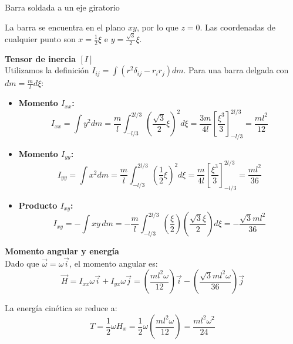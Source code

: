 \begin{solucion}{Barra soldada a un eje giratorio}
\begin{center}
\end{center}

La barra se encuentra en el plano $xy$, por lo que $z = 0$. Las coordenadas de cualquier punto son $x = \frac{1}{2}\xi$ e $y = \frac{\sqrt{3}}{2}\xi$.

\textbf{Tensor de inercia $[I]$}\\
Utilizamos la definición $I_{ij} = \int (r^2 \delta_{ij} - r_i r_j) dm$. Para una barra delgada con $dm = \frac{m}{l} d\xi$:

\begin{itemize}
    \item \textbf{Momento $I_{xx}$:}
    \[ I_{xx} = \int y^2 dm = \frac{m}{l} \int_{-l/3}^{2l/3} \left( \frac{\sqrt{3}}{2}\xi \right)^2 d\xi = \frac{3m}{4l} \left[ \frac{\xi^3}{3} \right]_{-l/3}^{2l/3} = \frac{ml^2}{12} \]

    \item \textbf{Momento $I_{yy}$:}
    \[ I_{yy} = \int x^2 dm = \frac{m}{l} \int_{-l/3}^{2l/3} \left( \frac{1}{2}\xi \right)^2 d\xi = \frac{m}{4l} \left[ \frac{\xi^3}{3} \right]_{-l/3}^{2l/3} = \frac{ml^2}{36} \]

    \item \textbf{Producto $I_{xy}$:}
    \[ I_{xy} = -\int xy \, dm = -\frac{m}{l} \int_{-l/3}^{2l/3} \left( \frac{\xi}{2} \right) \left( \frac{\sqrt{3}\xi}{2} \right) d\xi = -\frac{\sqrt{3}ml^2}{36} \]
\end{itemize}

\textbf{Momento angular y energía}\\
Dado que $\vec{\omega} = \omega \vec{i}$, el momento angular es:
\[ \vec{H} = I_{xx}\omega \vec{i} + I_{yx}\omega \vec{j} = \left( \frac{ml^2\omega}{12} \right) \vec{i} - \left( \frac{\sqrt{3}ml^2\omega}{36} \right) \vec{j} \]

La energía cinética se reduce a:
\[ T = \frac{1}{2} \omega H_x = \frac{1}{2} \omega \left( \frac{ml^2\omega}{12} \right) = \frac{ml^2\omega^2}{24} \]

\end{solucion}
